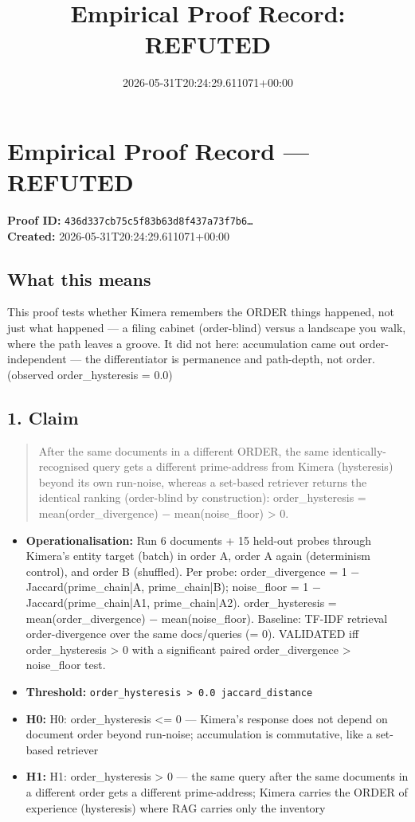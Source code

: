 \documentclass{article}
\title{Empirical Proof Record: REFUTED}
\date{2026-05-31T20:24:29.611071+00:00}
\begin{document}
\maketitle
\section*{Empirical Proof Record --- \textcolor{refuted}{\textbf{REFUTED}}}
\textbf{Proof ID:} \texttt{436d337cb75c5f83b63d8f437a73f7b6\dots}\\
\textbf{Created:} 2026-05-31T20:24:29.611071+00:00
\subsection*{What this means}
This proof tests whether Kimera remembers the ORDER things happened, not just what happened — a filing cabinet (order-blind) versus a landscape you walk, where the path leaves a groove. It did not here: accumulation came out order-independent — the differentiator is permanence and path-depth, not order. (observed order\_hysteresis = 0.0)
\subsection*{1. Claim}
\begin{quote}After the same documents in a different ORDER, the same identically-recognised query gets a different prime-address from Kimera (hysteresis) beyond its own run-noise, whereas a set-based retriever returns the identical ranking (order-blind by construction): order\_hysteresis = mean(order\_divergence) − mean(noise\_floor) > 0.\end{quote}
\begin{itemize}
\item \textbf{Operationalisation:} Run 6 documents + 15 held-out probes through Kimera's entity target (batch) in order A, order A again (determinism control), and order B (shuffled). Per probe: order\_divergence = 1 − Jaccard(prime\_chain|A, prime\_chain|B); noise\_floor = 1 − Jaccard(prime\_chain|A1, prime\_chain|A2). order\_hysteresis = mean(order\_divergence) − mean(noise\_floor). Baseline: TF-IDF retrieval order-divergence over the same docs/queries (= 0). VALIDATED iff order\_hysteresis > 0 with a significant paired order\_divergence > noise\_floor test.
\item \textbf{Threshold:} \texttt{order\_hysteresis > 0.0 jaccard\_distance}
\item \textbf{H0:} H0: order\_hysteresis <= 0 — Kimera's response does not depend on document order beyond run-noise; accumulation is commutative, like a set-based retriever
\item \textbf{H1:} H1: order\_hysteresis > 0 — the same query after the same documents in a different order gets a different prime-address; Kimera carries the ORDER of experience (hysteresis) where RAG carries only the inventory
\end{itemize}
\end{document}
